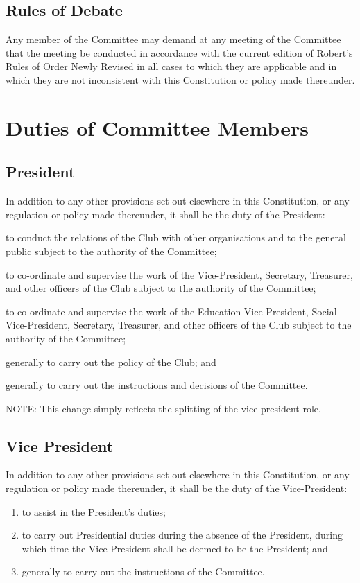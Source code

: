 \documentclass[11pt]{article} %
\begin{document}
\subsection{Rules of Debate}
Any member of the Committee may demand at any meeting of the Committee that the meeting be conducted in accordance with the current edition of Robert’s Rules of Order Newly Revised in all cases to which they are applicable and in which they are not inconsistent with this Constitution or policy made thereunder.

\section{Duties of Committee Members}
\subsection{President}
In addition to any other provisions set out elsewhere in this Constitution, or any regulation or policy made thereunder, it shall be the duty of the President:
\begin{enumerate}
	\item to conduct the relations of the Club with other organisations and to the general public subject to the authority of the Committee;
	{\color{red} \item to co-ordinate and supervise the work of the Vice-President, Secretary, Treasurer, and other officers of the Club subject to the authority of the Committee;}
	{\color{ForestGreen} \item to co-ordinate and supervise the work of the Education Vice-President, Social Vice-President, Secretary, Treasurer, and other officers of the Club subject to the authority of the Committee;}
	\item generally to carry out the policy of the Club; and
	\item generally to carry out the instructions and decisions of the Committee.
\end{enumerate}
{\color{Cyan}NOTE:
This change simply reflects the splitting of the vice president role.
}

{\color{red} \subsection{Vice President}
In addition to any other provisions set out elsewhere in this Constitution, or any regulation or policy made thereunder, it shall be the duty of the Vice-President:
\begin{enumerate}
	\item to assist in the President's duties;
	\item to carry out Presidential duties during the absence of the President, during which time the Vice-President shall be deemed to be the President; and
	\item generally to carry out the instructions of the Committee.
\end{enumerate}}
\end{document}
